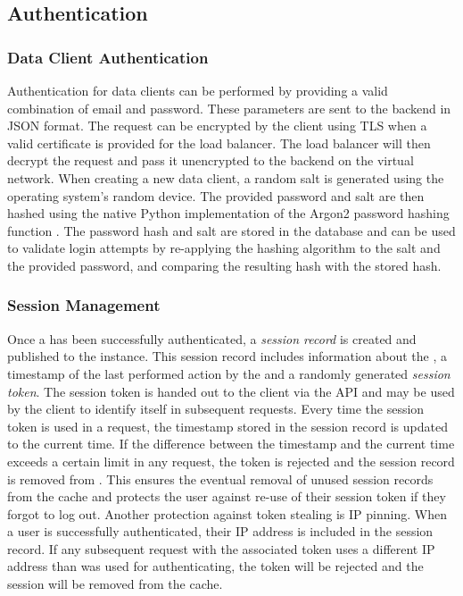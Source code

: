 \subsection{Authentication}
    \subsubsection{Data Client Authentication}
        Authentication for data clients can be performed by providing
        a valid combination of email and password. These parameters
        are sent to the backend in JSON format. The request
        can be encrypted by the client using TLS when a valid
        certificate is provided for the load balancer. The load balancer
        will then decrypt the request and pass it unencrypted to the backend
        on the virtual network. When creating a new data client,
        a random salt is generated using the operating system's
        random device. The provided password and salt are then hashed
        using the native Python implementation of the Argon2 password hashing function \cite{argon2}.
        The password hash and salt are stored in
        the database and can be used to validate login attempts
        by re-applying the hashing algorithm to the salt and the provided
        password, and comparing the resulting hash with the stored hash.

    \subsubsection{Session Management}
        Once a  has been successfully authenticated, a \textit{session record}
        is created and published to the  instance.
        This session record includes information about the
        , a timestamp of the last performed action by the 
        and a randomly generated \textit{session token}.
        The session token is handed out to the client via the API
        and may be used by the client to identify itself
        in subsequent requests. Every time the session token is used
        in a request, the timestamp stored in the session record is
        updated to the current time. If the difference between
        the timestamp and the current time exceeds a certain limit
        in any request, the token is rejected and the session record
        is removed from . This ensures the eventual
        removal of unused session records from the cache and protects
        the user against re-use of their session token if they forgot
        to log out. Another protection against token stealing
        is IP pinning. When a user is successfully authenticated,
        their IP address is included in the session record.
        If any subsequent request with the associated token
        uses a different IP address than was used for authenticating,
        the token will be rejected and the session will be removed
        from the cache.

